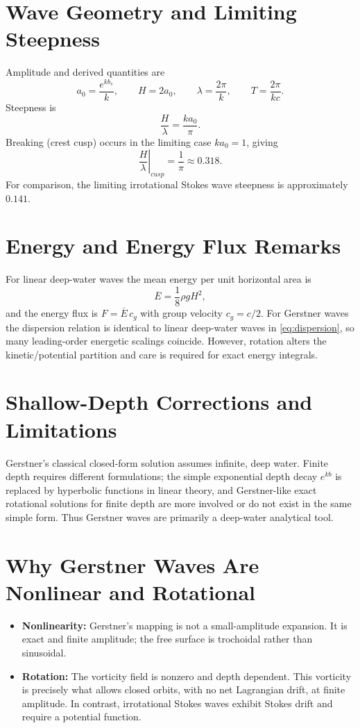 \documentclass[journal,10pt,twocolumn]{IEEEtran}
\def\text#1{#1}%
\begin{document}
\section{Wave Geometry and Limiting Steepness}

Amplitude and derived quantities are
\[
    a_0=\frac{e^{kb_s}}{k},\qquad
    H=2a_0,\qquad
    \lambda=\frac{2\pi}{k},\qquad
    T=\frac{2\pi}{kc}.
\]
Steepness is
\[
    \frac{H}{\lambda} = \frac{k a_0}{\pi}.
\]
Breaking (crest cusp) occurs in the limiting case $k a_0=1$, giving
\[
    \left.\frac{H}{\lambda}\right|_{\text{cusp}} = \frac{1}{\pi}\approx 0.318.
\]
For comparison, the limiting irrotational Stokes wave steepness is approximately $0.141$.

\section{Energy and Energy Flux Remarks}

For linear deep-water waves the mean energy per unit horizontal area is
\[
    \overline{E} = \frac{1}{8}\rho g H^2,
\]
and the energy flux is $F=\overline{E}\,c_g$ with group velocity $c_g=c/2$. For Gerstner waves the dispersion relation is identical to linear deep-water waves in \eqref{eq:dispersion}, so many leading-order energetic scalings coincide. However, rotation alters the kinetic/potential partition and care is required for exact energy integrals.

\section{Shallow-Depth Corrections and Limitations}

Gerstner's classical closed-form solution assumes infinite, deep water. Finite depth requires different formulations; the simple exponential depth decay $e^{kb}$ is replaced by hyperbolic functions in linear theory, and Gerstner-like exact rotational solutions for finite depth are more involved or do not exist in the same simple form. Thus Gerstner waves are primarily a deep-water analytical tool.

\section{Why Gerstner Waves Are Nonlinear and Rotational}

\begin{itemize}[leftmargin=1.4em]
    \item \textbf{Nonlinearity:} Gerstner's mapping is not a small-amplitude expansion. It is exact and finite amplitude; the free surface is trochoidal rather than sinusoidal.
    \item \textbf{Rotation:} The vorticity field is nonzero and depth dependent. This vorticity is precisely what allows closed orbits, with no net Lagrangian drift, at finite amplitude. In contrast, irrotational Stokes waves exhibit Stokes drift and require a potential function.
\end{itemize}
\end{document}
